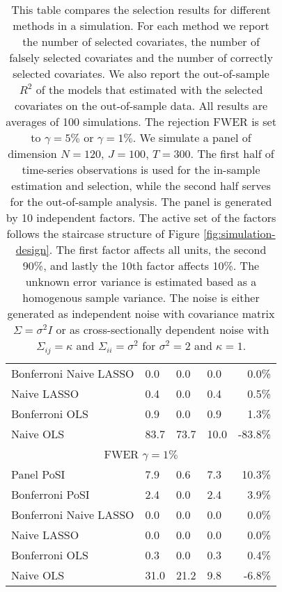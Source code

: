 \documentclass[11pt]{article}
\newcommand\bnotetab[1]{\captionsetup{position=bottom, font=footnotesize,  textfont=normalfont, margin=1mm, skip=2mm, justification=justified, singlelinecheck=false}\caption*{#1}}
\begin{document}
\begin{table}[t!]
{\begin{tabular}{@{}llllr@{}}
					Bonferroni Naive LASSO & 0.0  & 0.0  & 0.0  & 0.0\%   \\
					Naive LASSO            & 0.4  & 0.0  & 0.4  & 0.5\%    \\
					Bonferroni OLS         & 0.9  & 0.0  & 0.9  & 1.3\%    \\
					Naive OLS              & 83.7 & 73.7 & 10.0 & -83.8\%  \\      \midrule
					\multicolumn{5}{c}{FWER $\gamma=1\%$}   \\ \midrule
					Panel PoSI             & 7.9  & 0.6  & 7.3 & 10.3\% \\
					Bonferroni PoSI        & 2.4  & 0.0  & 2.4 & 3.9\%   \\
					Bonferroni Naive LASSO & 0.0  & 0.0  & 0.0 & 0.0\%   \\
					Naive LASSO            & 0.0  & 0.0  & 0.0 & 0.0\%   \\
					Bonferroni OLS         & 0.3  & 0.0  & 0.3 & 0.4\%   \\
					Naive OLS              & 31.0 & 21.2 & 9.8 & -6.8\% \\      
					\bottomrule
				\end{tabular}
			}
		\bnotetab{This table compares the selection results for different methods in a simulation. For each method we report the number of selected covariates, the number of falsely selected covariates and the number of correctly selected covariates. We also report the out-of-sample $R^2$ of the models that estimated with the selected covariates on the out-of-sample data. All results are averages of 100 simulations. The rejection FWER is set to $\gamma=5\%$ or $\gamma=1\%$. We simulate a panel of dimension $N=120$, $J=100$, $T=300$. The first half of time-series observations is used for the in-sample estimation and selection, while the second half serves for the out-of-sample analysis. The panel is generated by 10 independent factors. The active set of the factors follows the staircase structure of Figure \ref{fig:simulation-design}. The first factor affects all units, the second 90\%, and lastly the 10th factor affects 10\%. The unknown error variance is estimated based as a homogenous sample variance. The noise is either generated as independent noise with covariance matrix $\Sigma= \sigma^2 I$ or as cross-sectionally dependent noise with $\Sigma_{ij}=\kappa$ and $\Sigma_{ii}=\sigma^2$ for $\sigma^2=2$ and $\kappa=1$.}
	\end{table}
	
\end{document}
